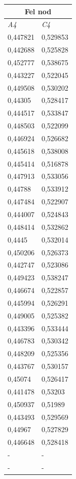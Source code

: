 \documentclass[a4paper,10pt]{article}
\begin{document}
\begin{centering}
{\begin{tabular}{| l | l| }
\hline
\multicolumn{2}{|c|}{Fel nod}\\ \hline
\emph{A4} & \emph{C4} \\ \hline
0,447821 & 0,529853 \\ \hline
0,442688 & 0,525828 \\ \hline
0,452777 & 0,538675 \\ \hline
0,443227 & 0,522045 \\ \hline
0,449508 & 0,530202 \\ \hline
0,44305  & 0,528417 \\ \hline
0,444517 & 0,533847 \\ \hline
0,448503 & 0,522099 \\ \hline
0,446924 & 0,526682 \\ \hline
0,445618 & 0,538008 \\ \hline
0,445414 & 0,516878 \\ \hline
0,447913 & 0,533056 \\ \hline
0,44788  & 0,533912 \\ \hline
0,447484 & 0,522907 \\ \hline
0,444007 & 0,524843 \\ \hline
0,448414 & 0,532862 \\ \hline
0,4445   & 0,532014 \\ \hline
0,450206 & 0,526373 \\ \hline
0,442747 & 0,523086 \\ \hline
0,449423 & 0,538247 \\ \hline
0,446674 & 0,522857 \\ \hline
0,445994 & 0,526291 \\ \hline
0,449005 & 0,525382 \\ \hline
0,443396 & 0,533444 \\ \hline
0,446783 & 0,530342 \\ \hline
0,448209 & 0,525356 \\ \hline
0,443767 & 0,530157 \\ \hline
0,45074  & 0,526417 \\ \hline
0,441478 & 0,53203  \\ \hline
0,450937 & 0,51989  \\ \hline
0,443493 & 0,529569 \\ \hline
0,44967  & 0,527829 \\ \hline\hline
0,446648 & 0,528418 \\ \hline
- & - \\ \hline
- & - \\ \hline
\end{tabular}




}
\end{centering}
\end{document}
